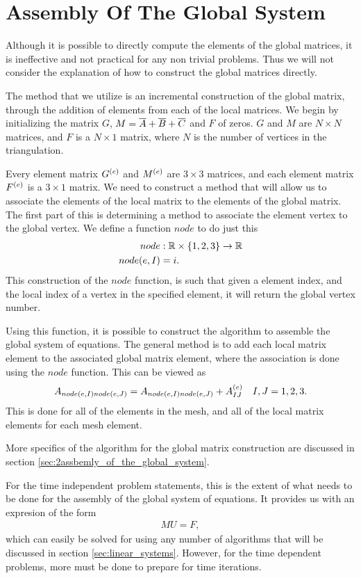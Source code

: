 \documentclass[../fem.tex]{subfile}
\begin{document}
\section{Assembly Of The Global System}%
\label{sec:assembly_of_the_global_system}

Although it is possible to directly compute the elements of the global
matrices, it is ineffective and not practical for any non trivial problems.
Thus we will not consider the explanation of how to construct the global
matrices directly.

The method that we utilize is an incremental construction of the global matrix,
through the addition of elements from each of the local matrices. We begin by
initializing the matrix $G$, $M=\overline{A}+\overline{B}+\overline{C}$ and $F$ of zeros. $G$ and
$M$ are $N\times N$ matrices, and $F$ is a $N\times 1$ matrix, where $N$ is the
number of vertices in the triangulation.

Every element matrix $G^{(e)}$ and $M^{(e)}$ are $3\times 3$ matrices, and each element matrix
$F^{(e)}$ is a $3\times 1$ matrix. We need to construct a method that will allow
us to associate the elements of the local matrix to the elements of the global
matrix. The first part of this is determining a method to associate the element
vertex to the global vertex. We define a function $node$ to do just this
\begin{align*}
  node&:\mathbb{R}\times\{1,2,3\}\rightarrow\mathbb{R}\\
  node(e,I)&=i.
\end{align*}
This construction of the $node$ function, is such that given a element index,
and the local index of a vertex in the specified element, it will return the
global vertex number.

Using this function, it is possible to construct the algorithm to assemble the
global system of equations. The general method is to add each local matrix
element to the associated global matrix element, where the association is done
using the $node$ function. This can be viewed as
\begin{align*}
  A_{node(e,I)node(e,J)}=A_{node(e,I)node(e,J)}+A^{(e)}_{IJ}\quad I,J=1,2,3.
\end{align*}
This is done for all of the elements in the mesh, and all of the local matrix
elements for each mesh element.

More specifics of the algorithm for the global matrix construction are
discussed in section \ref{sec:2assbemly_of_the_global_system}.

For the time independent problem statements, this is the extent of what needs
to be done for the assembly of the global system of equations. It provides us
with an expresion of the form
\begin{align*}
   MU=F,
\end{align*}
which can easily be solved for using any number of algorithms that will be
discussed in section \ref{sec:linear_systems}.  However, for the time dependent
problems, more must be done to prepare for time iterations.
\end{document}
